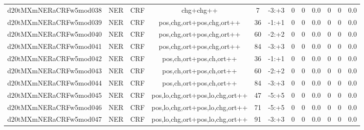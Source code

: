 \documentclass[a4paper]{article}
\begin{document}
\begin{landscape}
\begin{center}
\begin{tabular}{ |c|c|c|c|c|c|c|c|c|c|c|c|}
 
 	
 	\small{ d20tMXmNERaCRFw5mod038 } & \small{ NER} & \small{  CRF }  & chg+chg++  &  7 &  \small{  -3:+3 }  &  0 & 0 & 0.0  &  0 & 0 & 0.0 \\
 	

 
 	
 	\small{ d20tMXmNERaCRFw5mod039 } & \small{ NER} & \small{  CRF }  & pos,chg,ort+pos,chg,ort++  &  36 &  \small{  -1:+1 }  &  0 & 0 & 0.0  &  0 & 0 & 0.0 \\
 	

 
 	
 	\small{ d20tMXmNERaCRFw5mod040 } & \small{ NER} & \small{  CRF }  & pos,chg,ort+pos,chg,ort++  &  60 &  \small{  -2:+2 }  &  0 & 0 & 0.0  &  0 & 0 & 0.0 \\
 	

 
 	
 	\small{ d20tMXmNERaCRFw5mod041 } & \small{ NER} & \small{  CRF }  & pos,chg,ort+pos,chg,ort++  &  84 &  \small{  -3:+3 }  &  0 & 0 & 0.0  &  0 & 0 & 0.0 \\
 	

 
 	
 	\small{ d20tMXmNERaCRFw5mod042 } & \small{ NER} & \small{  CRF }  & pos,ch,ort+pos,ch,ort++  &  36 &  \small{  -1:+1 }  &  0 & 0 & 0.0  &  0 & 0 & 0.0 \\
 	

 
 	
 	\small{ d20tMXmNERaCRFw5mod043 } & \small{ NER} & \small{  CRF }  & pos,ch,ort+pos,ch,ort++  &  60 &  \small{  -2:+2 }  &  0 & 0 & 0.0  &  0 & 0 & 0.0 \\
 	

 
 	
 	\small{ d20tMXmNERaCRFw5mod044 } & \small{ NER} & \small{  CRF }  & pos,ch,ort+pos,ch,ort++  &  84 &  \small{  -3:+3 }  &  0 & 0 & 0.0  &  0 & 0 & 0.0 \\
 	

 
 	
 	\small{ d20tMXmNERaCRFw5mod045 } & \small{ NER} & \small{  CRF }  & pos,lo,chg,ort+pos,lo,chg,ort++  &  47 &  \small{  -5:+5 }  &  0 & 0 & 0.0  &  0 & 0 & 0.0 \\
 	

 
 	
 	\small{ d20tMXmNERaCRFw5mod046 } & \small{ NER} & \small{  CRF }  & pos,lo,chg,ort+pos,lo,chg,ort++  &  71 &  \small{  -5:+5 }  &  0 & 0 & 0.0  &  0 & 0 & 0.0 \\
 	

 
 	
 	\small{ d20tMXmNERaCRFw5mod047 } & \small{ NER} & \small{  CRF }  & pos,lo,chg,ort+pos,lo,chg,ort++  &  91 &  \small{  -3:+3 }  &  0 & 0 & 0.0  &  0 & 0 & 0.0 \\
 	


\end{tabular}
\end{center}
\end{landscape}
\end{document}

